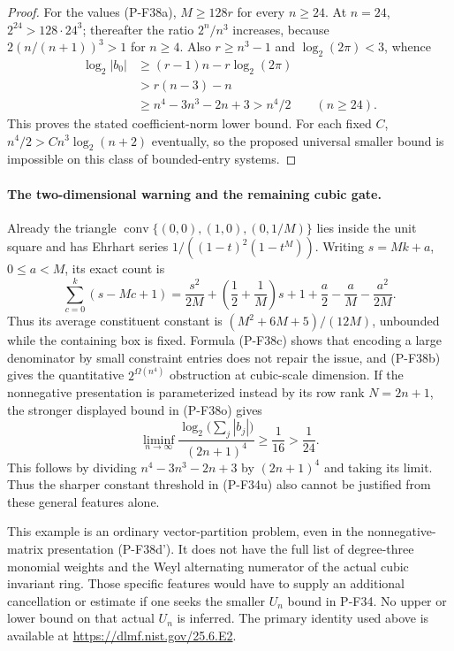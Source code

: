 \begin{proof}
For the values (P-F38a), $M\ge128r$ for every $n\ge24$.
At $n=24$, $2^{24}>128\cdot24^3$; thereafter the ratio
$2^n/n^3$ increases, because
$2(n/(n+1))^3>1$ for $n\ge4$.
Also $r\ge n^3-1$ and $\log_2(2\pi)<3$, whence
\[
 \begin{split}
 \log_2|b_0|
 &\ge (r-1)n-r\log_2(2\pi)\\
 &>r(n-3)-n\\
 &\ge n^4-3n^3-2n+3
 >n^4/2\qquad(n\ge24).
 \end{split}
 \tag{P-F38o}
\]
This proves the stated coefficient-norm lower bound.
For each fixed $C$, $n^4/2>Cn^3\log_2(n+2)$ eventually,
so the proposed universal smaller bound is impossible
on this class of bounded-entry systems.
\end{proof}

\paragraph{The two-dimensional warning and the remaining cubic gate.}
Already the triangle
$\operatorname{conv}\{(0,0),(1,0),(0,1/M)\}$ lies inside
the unit square and has Ehrhart series
$1/((1-t)^2(1-t^M))$. Writing $s=Mk+a$, $0\le a<M$,
its exact count is
\[
 \sum_{c=0}^{k}(s-Mc+1)
   =\frac{s^2}{2M}+
       \left(\frac12+\frac1M\right)s+
       1+\frac a2-\frac aM-\frac{a^2}{2M}.
 \tag{P-F38p}
\]
Thus its average constituent constant is
$(M^2+6M+5)/(12M)$, unbounded while the containing box
is fixed. Formula (P-F38c) shows that encoding a large
denominator by small constraint entries does not repair
the issue, and (P-F38b) gives the quantitative
$2^{\Omega(n^4)}$ obstruction at cubic-scale dimension.
If the nonnegative presentation is parameterized instead by
its row rank $N=2n+1$, the stronger displayed bound in
(P-F38o) gives
\[
 \liminf_{n\to\infty}
   \frac{\log_2\bigl(\sum_j|b_j|\bigr)}{(2n+1)^4}
       \ge\frac1{16}>\frac1{24}.
 \tag{P-F38q}
\]
This follows by dividing $n^4-3n^3-2n+3$ by $(2n+1)^4$
and taking its limit. Thus the sharper constant threshold
in (P-F34u) also cannot be justified from these general
features alone.

This example is an ordinary vector-partition problem,
even in the nonnegative-matrix presentation (P-F38d').
It does not have the full list of degree-three
monomial weights and the Weyl alternating numerator
of the actual cubic invariant ring. Those specific
features would have to supply an additional cancellation
or estimate if one seeks the smaller $U_n$ bound in P-F34.
No upper or lower bound on that actual $U_n$ is inferred.
The primary identity used above is available at
\url{https://dlmf.nist.gov/25.6.E2}.

